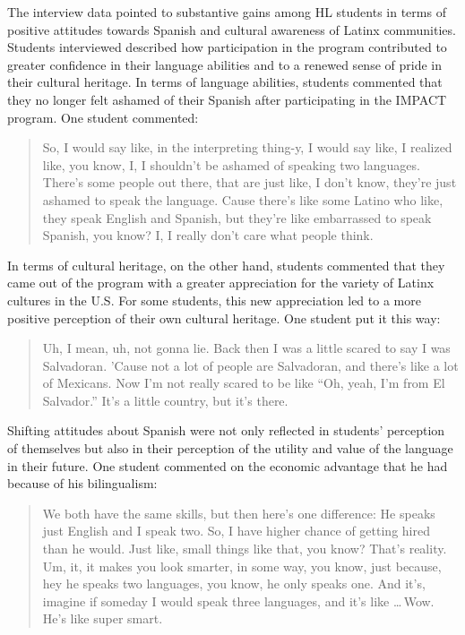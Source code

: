 \documentclass[output=paper]{langscibook}
\begin{document}
The interview data pointed to substantive gains among HL students in terms of positive attitudes towards Spanish and cultural awareness of Latinx communities. Students interviewed described how participation in the program contributed to greater confidence in their language abilities and to a renewed sense of pride in their cultural heritage. In terms of language abilities, students commented that they no longer felt ashamed of their Spanish after participating in the IMPACT program. One student commented:

\begin{quote}
So, I would say like, in the interpreting thing-y, I would say like, I realized like, you know, I, I shouldn't be ashamed of speaking two languages. There's some people out there, that are just like, I don't know, they're just ashamed to speak the language. Cause there's like some Latino who like, they speak English and Spanish, but they're like embarrassed to speak Spanish, you know? I, I really don't care what people think.
\end{quote}

In terms of cultural heritage, on the other hand, students commented that they came out of the program with a greater appreciation for the variety of Latinx cultures in the U.S. For some students, this new appreciation led to a more positive perception of their own cultural heritage. One student put it this way:

\begin{quote}
Uh, I mean, uh, not gonna lie. Back then I was a little scared to say I was Salvadoran. 'Cause not a lot of people are Salvadoran, and there's like a lot of Mexicans. Now I'm not really scared to be like ``Oh, yeah, I'm from El Salvador.'' It's a little country, but it's there.
\end{quote}

Shifting attitudes about Spanish were not only reflected in students’ perception of themselves but also in their perception of the utility and value of the language in their future. One student commented on the economic advantage that he had because of his bilingualism:

\begin{quote}
We both have the same skills, but then here's one difference:  He speaks just English and I speak two. So, I have higher chance of getting hired than he would. Just like, small things like that, you know? That's reality. Um, it, it makes you look smarter, in some way, you know, just because, hey he speaks two languages, you know, he only speaks one. And it's, imagine if someday I would speak three languages, and it's like \ldots\,Wow. He's like super smart.
\end{quote}
\end{document}

